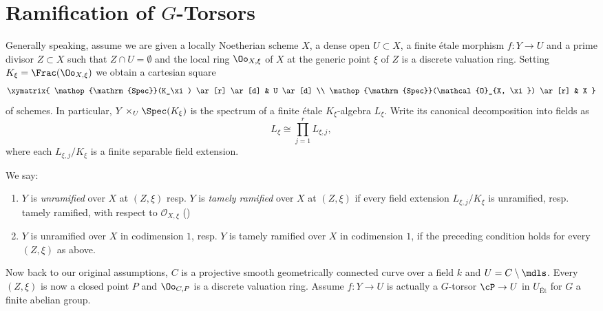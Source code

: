 \section{\texorpdfstring{Ramification of $G$-Torsors}{Ramification of G-Torsors}}\label{section:ramification_of_torsors}

Generally speaking, assume we are given a locally Noetherian scheme $X$,
a dense open $U \subset X$, a finite \'etale morphism $f: Y \to U$ and a prime divisor $Z \subset X$ such that $Z \cap U = \emptyset$
and the local ring $\Oo_{X, \xi}$ of $X$ at the generic point $\xi$ of $Z$ is a discrete valuation ring.
Setting $K_\xi = \Frac(\Oo_{X, \xi})$ we obtain a cartesian square
\[ \xymatrix{ \mathop{\mathrm{Spec}}(K_\xi ) \ar[r] \ar[d] & U \ar[d] \\ \mathop{\mathrm{Spec}}(\mathcal{O}_{X, \xi }) \ar[r] & X } \]
of schemes.
In particular, $Y \times_U \Spec(K_\xi)$ is the spectrum of a finite \'etale
$K_\xi$-algebra $L_\xi$. Write its canonical decomposition into fields as
\[
    L_\xi \cong \prod_{j=1}^r L_{\xi,j},
\]
where each $L_{\xi,j}/K_\xi$ is a finite separable field extension.
\begin{definition}\label{definition:tamely_ramified_in_codim_1}
We say:
\begin{enumerate}
    \item $Y$ is \textit{unramified} over $X$ at $(Z, \xi)$ resp. $Y$ is \textit{tamely ramified} over $X$ at $(Z, \xi)$
        if every field extension $L_{\xi,j}/K_\xi$ is unramified, resp. tamely ramified, with respect to $\mathcal{O}_{X, \xi}$
        ()

    \item $Y$ is unramified over $X$ in codimension $1$, resp. $Y$ is tamely ramified over $X$ in codimension $1$, if the preceding condition holds for every $(Z, \xi)$ as above.
\end{enumerate}
\end{definition}

Now back to our original assumptions, $C$ is a projective smooth geometrically connected curve
over a field $k$ and $U=C\setminus \mdls$. Every $(Z, \xi)$ is now a closed point $P$ and $\Oo_{C, P}$ is a discrete valuation ring.
Assume $f: Y \to U$ is actually a $G$-torsor $\cP \to U$ in $U_{\text{\'Et}}$ for $G$ a finite abelian group.

